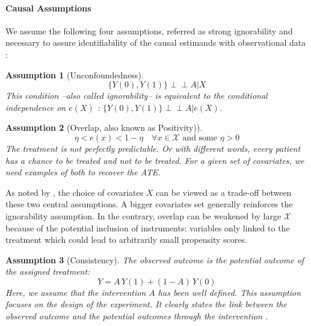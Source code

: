 \documentclass{report}
\newcommand{\indep}{\perp \!\!\! \perp}
\newtheorem{assumption}{Assumption}
\begin{document}
\begin{background_box_left}


  \paragraph{Causal Assumptions}\label{background:causal_assumptions}

  We assume the following four assumptions, referred as strong ignorability and
  necessary to assure identifiability of the causal estimands with observational
  data \citep{rubin_causal_2005}:
  \begin{assumption}[Unconfoundedness]\label{assumption:ignorability}
    \begin{equation*}\label{eq:ignorability}
      \{Y(0), Y(1) \} \indep A | X
    \end{equation*}
    This condition --also called ignorability-- is equivalent to the conditional
    independence on $e(X)$ \citep{rosenbaum_central_1983}: $\{Y(0), Y(1) \}
      \indep  A | e(X)$.
  \end{assumption}


  \begin{assumption}[Overlap, also known as Positivity)]\label{assumption:overlap}
    \begin{equation*}\label{eq:overlap}
      \eta < e(x) < 1 - \eta \quad \forall x \in \mathcal X \text{ and some } \eta > 0
    \end{equation*}
    The treatment is not perfectly predictable. Or with different words, every
    patient has a chance to be treated and not to be treated. For a given set of
    covariates, we need examples of both to recover the ATE.
  \end{assumption}

  As noted by \cite{damour_overlap_2020}, the choice of covariates $X$ can
  be viewed as a trade-off between these two central assumptions. A bigger
  covariates set generally reinforces the ignorability assumption. In the
  contrary, overlap can be weakened by large $\mathcal{X}$ because of the
  potential inclusion of instruments: variables only linked to the treatment which
  could lead to arbitrarily small propensity scores.


  \begin{assumption}[Consistency]\label{assumption:consistency} The observed
    outcome is the potential outcome of the assigned treatment:
    \begin{equation*}\label{eq:consistancy}
      Y = A \, Y(1) + (1-A) \, Y(0)
    \end{equation*}
    Here, we assume that the intervention $A$ has been well defined. This
    assumption focuses on the design of the experiment. It clearly states the link
    between the observed outcome and the potential outcomes through the
    intervention \citep{hernan_causal_2020}.
  \end{assumption}


\end{background_box_left}
\end{document}
